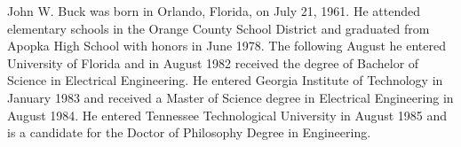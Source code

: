 
John W. Buck was born in Orlando, Florida, on July 21, 1961. He
attended elementary schools in the Orange County School District and
graduated from Apopka High School with honors in June 1978. The
following August he entered University of Florida and in August 1982
received the degree of Bachelor of Science in Electrical Engineering.
He entered Georgia Institute of Technology in January 1983 and
received a Master of Science degree in Electrical Engineering in
August 1984. He entered Tennessee Technological University in August
1985 and is a candidate for the Doctor of Philosophy Degree in
Engineering.
